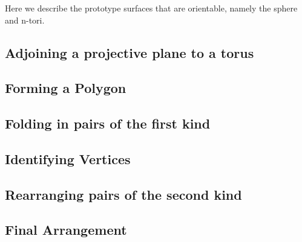 Here we describe the prototype surfaces that are orientable, namely
the sphere and n-tori.


\subsection{Adjoining a projective plane to a torus}
\label{sec:surf:adjoin}

\subsection{Forming a Polygon}
\label{sec:surf:polygon}

\subsection{Folding in pairs of the first kind}
\label{sec:surf:vertices}

\subsection{Identifying Vertices}
\label{sec:surf:folding}

\subsection{Rearranging pairs of the second kind}
\label{sec:surf:second}

\subsection{Final Arrangement}
\label{sec:surf:final}


